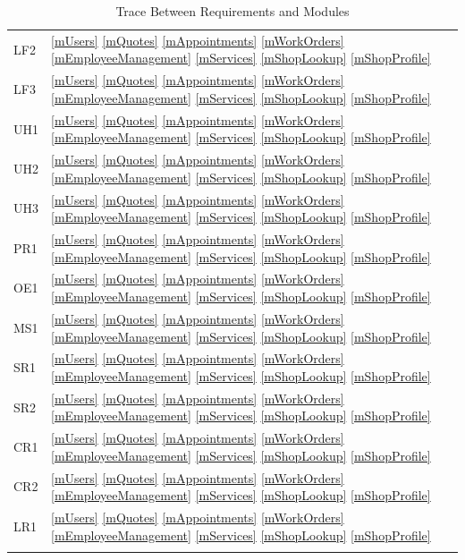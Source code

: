 \documentclass[12pt, titlepage]{article}
\begin{document}
\begin{longtable}{p{} p{}}
	LF2                   & \ref{mUsers} \ref{mQuotes} \ref{mAppointments} \ref{mWorkOrders} \ref{mEmployeeManagement} \ref{mServices} \ref{mShopLookup} \ref{mShopProfile} \\
	LF3                   & \ref{mUsers} \ref{mQuotes} \ref{mAppointments} \ref{mWorkOrders} \ref{mEmployeeManagement} \ref{mServices} \ref{mShopLookup} \ref{mShopProfile} \\
	UH1                   & \ref{mUsers} \ref{mQuotes} \ref{mAppointments} \ref{mWorkOrders} \ref{mEmployeeManagement} \ref{mServices} \ref{mShopLookup} \ref{mShopProfile} \\
	UH2                   & \ref{mUsers} \ref{mQuotes} \ref{mAppointments} \ref{mWorkOrders} \ref{mEmployeeManagement} \ref{mServices} \ref{mShopLookup} \ref{mShopProfile} \\
	UH3                   & \ref{mUsers} \ref{mQuotes} \ref{mAppointments} \ref{mWorkOrders} \ref{mEmployeeManagement} \ref{mServices} \ref{mShopLookup} \ref{mShopProfile} \\
	PR1                   & \ref{mUsers} \ref{mQuotes} \ref{mAppointments} \ref{mWorkOrders} \ref{mEmployeeManagement} \ref{mServices} \ref{mShopLookup} \ref{mShopProfile} \\
	OE1                   & \ref{mUsers} \ref{mQuotes} \ref{mAppointments} \ref{mWorkOrders} \ref{mEmployeeManagement} \ref{mServices} \ref{mShopLookup} \ref{mShopProfile} \\
	MS1                   & \ref{mUsers} \ref{mQuotes} \ref{mAppointments} \ref{mWorkOrders} \ref{mEmployeeManagement} \ref{mServices} \ref{mShopLookup} \ref{mShopProfile} \\
	SR1                   & \ref{mUsers} \ref{mQuotes} \ref{mAppointments} \ref{mWorkOrders} \ref{mEmployeeManagement} \ref{mServices} \ref{mShopLookup} \ref{mShopProfile} \\
	SR2                   & \ref{mUsers} \ref{mQuotes} \ref{mAppointments} \ref{mWorkOrders} \ref{mEmployeeManagement} \ref{mServices} \ref{mShopLookup} \ref{mShopProfile} \\
	CR1                   & \ref{mUsers} \ref{mQuotes} \ref{mAppointments} \ref{mWorkOrders} \ref{mEmployeeManagement} \ref{mServices} \ref{mShopLookup} \ref{mShopProfile} \\
	CR2                   & \ref{mUsers} \ref{mQuotes} \ref{mAppointments} \ref{mWorkOrders} \ref{mEmployeeManagement} \ref{mServices} \ref{mShopLookup} \ref{mShopProfile} \\
	LR1                   & \ref{mUsers} \ref{mQuotes} \ref{mAppointments} \ref{mWorkOrders} \ref{mEmployeeManagement} \ref{mServices} \ref{mShopLookup} \ref{mShopProfile} \\
	\bottomrule
	\caption{Trace Between Requirements and Modules}
	\label{TblRT}
\end{longtable}
\end{document}

